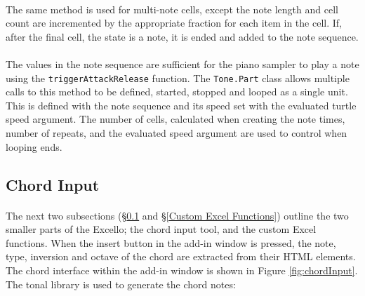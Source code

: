 \paragraph{} The same method is used for multi-note cells, except the note length and cell count are incremented by the appropriate fraction for each item in the cell. If, after the final cell, the state is a note, it is ended and added to the note sequence.

\paragraph{} The values in the note sequence are sufficient for the piano sampler to play a note using the \texttt{triggerAttackRelease} function. The \texttt{Tone.Part} class allows multiple calls to this method to be defined, started, stopped and looped as a single unit. This is defined with the note sequence and its speed set with the evaluated turtle speed argument. The number of cells, calculated when creating the note times, number of repeats, and the evaluated speed argument are used to control when looping ends.



\subsection{Chord Input}\label{Chord Input}

\paragraph{} The next two subsections (\S\ref{Chord Input} and \S\ref{Custom Excel Functions}) outline the two smaller parts of the Excello; the chord input tool, and the custom Excel functions. When the insert button in the add-in window is pressed, the note, type, inversion and octave of the chord are extracted from their HTML elements. The chord interface within the add-in window is shown in Figure \ref{fig:chordInput}. The tonal library is used to generate the chord notes:

